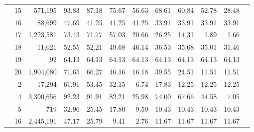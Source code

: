 \begin{table}
{\begin{tabular}{crrrrrrrrrrr}
& 15 & 571,195 & 93.83 & 87.18 & 75.67 & 56.63 & 68.61 & 60.84 & 52.78 & 28.48 \\ 
& 16 & 88,699 & 47.69 & 41.25 & 41.25 & 41.25 & 33.91 & 33.91 & 33.91 & 33.91 \\ 
& 17 & 1,223,581 & 73.43 & 71.77 & 57.03 & 20.66 & 26.25 & 14.31 & 1.89 & 1.66 \\ 
& 18 & 11,021 & 52.55 & 52.21 & 49.68 & 46.14 & 36.53 & 35.68 & 35.01 & 31.46 \\ 
& 19 & 92 & 64.13 & 64.13 & 64.13 & 64.13 & 64.13 & 64.13 & 64.13 & 64.13 \\ 
& 20 & 1,904,080 & 71.65 & 66.27 & 46.16 & 16.18 & 39.55 & 24.51 & 11.51 & 11.51 \\ 
\noalign{\medskip}
\parbox[t]{2mm}{} &
2 & 17,294 & 61.91 & 53.45 & 32.15 & 6.74 & 17.83 & 12.25 & 12.25 & 12.25 \\
& 4 & 3,390,656 & 92.23 & 91.91 & 82.21 & 25.98 & 74.00 & 67.66 & 44.58 & 7.05 \\
& 5 & 719 & 32.96 & 25.45 & 17.80 & 9.59 & 10.43 & 10.43 & 10.43 & 10.43 \\
& 16 & 2,445,191 & 47.17 & 25.79 & 9.41 & 2.76 & 11.67 & 11.67 & 11.67 & 11.67 \\
\hline
\end{tabular}
}
\end{table} 

